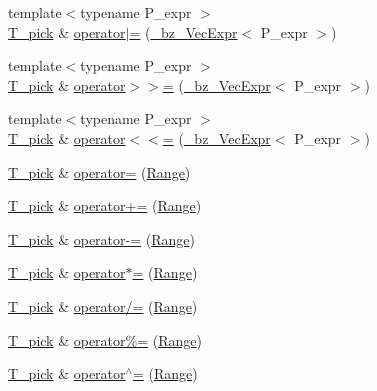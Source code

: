 \begin{DoxyCompactItemize}
{\footnotesize template$<$typename P\+\_\+expr $>$ }\\\hyperlink{classVectorPick_ab257fd713ce0f2a81bc79059cec93ac9}{T\+\_\+pick} \& \hyperlink{classVectorPick_a6b4fbd27ad61913e3bad6474b785a34f}{operator$\vert$=} (\hyperlink{class__bz__VecExpr}{\+\_\+bz\+\_\+\+Vec\+Expr}$<$ P\+\_\+expr $>$)
\item 
{\footnotesize template$<$typename P\+\_\+expr $>$ }\\\hyperlink{classVectorPick_ab257fd713ce0f2a81bc79059cec93ac9}{T\+\_\+pick} \& \hyperlink{classVectorPick_a0e72b74d6fec14a71390d018d8f74446}{operator$>$$>$=} (\hyperlink{class__bz__VecExpr}{\+\_\+bz\+\_\+\+Vec\+Expr}$<$ P\+\_\+expr $>$)
\item 
{\footnotesize template$<$typename P\+\_\+expr $>$ }\\\hyperlink{classVectorPick_ab257fd713ce0f2a81bc79059cec93ac9}{T\+\_\+pick} \& \hyperlink{classVectorPick_a1ae519a9e7940366dc420e661ffe3ad6}{operator$<$$<$=} (\hyperlink{class__bz__VecExpr}{\+\_\+bz\+\_\+\+Vec\+Expr}$<$ P\+\_\+expr $>$)
\item 
\hyperlink{classVectorPick_ab257fd713ce0f2a81bc79059cec93ac9}{T\+\_\+pick} \& \hyperlink{classVectorPick_a2914545a436fe8114e05b1704ad201fa}{operator=} (\hyperlink{classRange}{Range})
\item 
\hyperlink{classVectorPick_ab257fd713ce0f2a81bc79059cec93ac9}{T\+\_\+pick} \& \hyperlink{classVectorPick_ab04571692fd1cac17d3f7ff0e930f929}{operator+=} (\hyperlink{classRange}{Range})
\item 
\hyperlink{classVectorPick_ab257fd713ce0f2a81bc79059cec93ac9}{T\+\_\+pick} \& \hyperlink{classVectorPick_a7cc4fd3908e74c2b25a7c632b434b8b0}{operator-\/=} (\hyperlink{classRange}{Range})
\item 
\hyperlink{classVectorPick_ab257fd713ce0f2a81bc79059cec93ac9}{T\+\_\+pick} \& \hyperlink{classVectorPick_a8d6409525da1e0c6f78aea56e8171967}{operator$\ast$=} (\hyperlink{classRange}{Range})
\item 
\hyperlink{classVectorPick_ab257fd713ce0f2a81bc79059cec93ac9}{T\+\_\+pick} \& \hyperlink{classVectorPick_a2b11a732c74c2d92565e80289e0aba8e}{operator/=} (\hyperlink{classRange}{Range})
\item 
\hyperlink{classVectorPick_ab257fd713ce0f2a81bc79059cec93ac9}{T\+\_\+pick} \& \hyperlink{classVectorPick_a5c77541150307e7c013e98993298f2ba}{operator\%=} (\hyperlink{classRange}{Range})
\item 
\hyperlink{classVectorPick_ab257fd713ce0f2a81bc79059cec93ac9}{T\+\_\+pick} \& \hyperlink{classVectorPick_a7023e805054b66145f30c172a27a0f44}{operator$^\wedge$=} (\hyperlink{classRange}{Range})

\end{DoxyCompactItemize}
